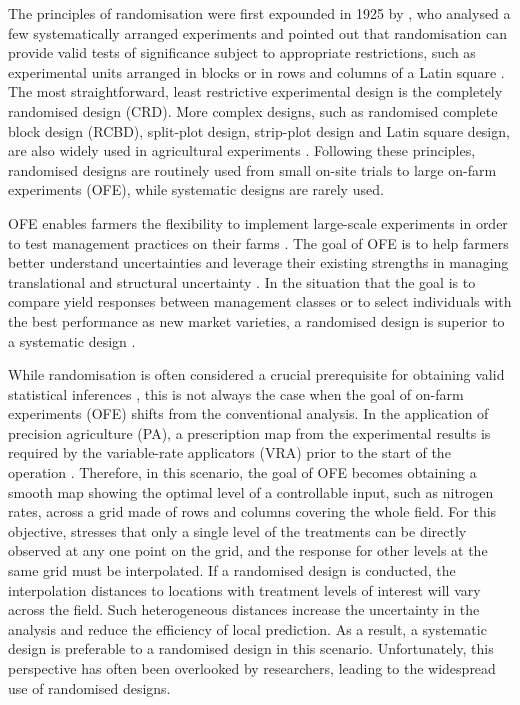 \documentclass[a4paper]{article} 	%
\begin{document}
The principles of randomisation were first expounded in 1925 by \textcite{Fisher1934Statistical}, who analysed a few systematically arranged experiments and pointed out that randomisation can provide valid tests of significance subject to appropriate restrictions, such as experimental units arranged in blocks or in rows and columns of a Latin square \parencite{Verdooren2020History}. The most straightforward, least restrictive experimental design is the completely randomised design (CRD). More complex designs, such as randomised complete block design (RCBD), split-plot design, strip-plot design and Latin square design, are also widely used in agricultural experiments \parencite{Petersen1994Agricultural}. Following these principles, randomised designs are routinely used from small on-site trials to large on-farm experiments (OFE), while systematic designs are rarely used.


OFE enables farmers the flexibility to implement large-scale experiments in order to test management practices on their farms \parencite{Evans2020Assessment}. The goal of OFE is to help farmers better understand uncertainties and leverage their existing strengths in managing translational and structural uncertainty \parencite{Cook2013Onfarm}. In the situation that the goal is to compare yield responses between management classes or to select individuals with the best performance as new market varieties, a randomised design is superior to a systematic design \parencite{Pringle2004FieldScale, Selle2019Flexible}. 

While randomisation is often considered a crucial prerequisite for obtaining valid statistical inferences \parencite{Piepho2013Why}, this is not always the case when the goal of on-farm experiments (OFE) shifts from the conventional analysis. In the application of precision agriculture (PA), a prescription map from the experimental results is required by the variable-rate applicators (VRA) prior to the start of the operation \parencite{Pringle2004FieldScale}. Therefore, in this scenario, the goal of OFE becomes obtaining a smooth map showing the optimal level of a controllable input, such as nitrogen rates, across a grid made of rows and columns covering the whole field. For this objective, \textcite{Piepho2011Statistical} stresses that only a single level of the treatments can be directly observed at any one point on the grid, and the response for other levels at the same grid must be interpolated. If a randomised design is conducted, the interpolation distances to locations with treatment levels of interest will vary across the field. Such heterogeneous distances increase the uncertainty in the analysis and reduce the efficiency of local prediction. As a result, a systematic design is preferable to a randomised design in this scenario. Unfortunately, this perspective has often been overlooked by researchers, leading to the widespread use of randomised designs.
\end{document}
